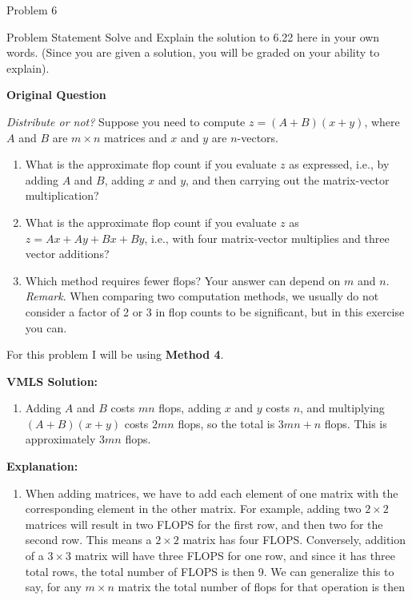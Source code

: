\begin{problem}{Problem 6}
    \begin{statement}{Problem Statement}
        Solve and Explain the solution to 6.22 here in your own words. (Since you are given a solution, you will be graded on your ability to explain). \vspace*{1em}

        \noindent \textbf{Original Question} \vspace*{1em}

        \textit{Distribute or not?} Suppose you need to compute $z = (A+ B)(x+ y)$, where $A$ and $B$ are $m \times n$ matrices and $x$ and $y$ are $n$-vectors.

        \begin{enumerate}[label = (\alph*)]
            \item What is the approximate flop count if you evaluate $z$ as expressed, i.e., by adding $A$ and $B$, adding $x$ and $y$, and then carrying out the matrix-vector multiplication?
            \item What is the approximate flop count if you evaluate $z$ as $z = Ax + Ay + Bx + By$, i.e., with four matrix-vector multiplies and three vector additions?
            \item Which method requires fewer flops? Your answer can depend on $m$ and $n$. \textit{Remark}. When comparing two computation methods, we usually do not consider a factor of 2 or 3 in 
            flop counts to be significant, but in this exercise you can.
        \end{enumerate}
    \end{statement}

    \begin{highlight}
        For this problem I will be using \textbf{Method 4}. \vspace*{1em}

        \noindent \textbf{VMLS Solution:}

        \begin{enumerate}[label = (\alph*)]
            \item Adding $A$ and $B$ costs $mn$ flops, adding $x$ and $y$ costs $n$, and multiplying $(A + B)(x + y)$ costs $2mn$ flops, so the total is $3mn + n$ flops. This is approximately $3mn$ flops.
        \end{enumerate}

        \noindent \textbf{Explanation:}

        \begin{enumerate}[label = (\alph*)]
            \item When adding matrices, we have to add each element of one matrix with the corresponding element in the other matrix. For example, adding two $2 \times 2$ matrices will result in two FLOPS for
            the first row, and then two for the second row. This means a $2 \times 2$ matrix has four FLOPS. Conversely, addition of a $3 \times 3$ matrix will have three FLOPS for one row, and since it
            has three total rows, the total number of FLOPS is then 9. We can generalize this to say, for any $m \times n$ matrix the total number of flops for that operation is then
    

\end{enumerate}
\end{highlight}
\end{problem}
